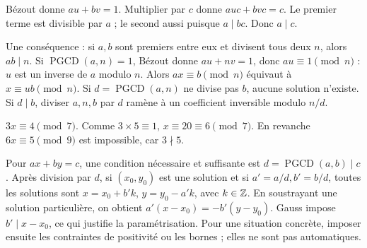\begin{demonstration}
Bézout donne $au+bv=1$. Multiplier par $c$ donne $auc+bvc=c$.
Le premier terme est divisible par $a$ ; le second aussi puisque $a\mid bc$. Donc $a\mid c$.
\end{demonstration}
Une conséquence : si $a,b$ sont premiers entre eux et divisent tous deux $n$, alors $ab\mid n$.
Si $\operatorname{PGCD}(a,n)=1$, Bézout donne $au+nv=1$, donc $au\equiv1\pmod n$ : $u$ est un inverse de $a$ modulo $n$.
Alors $ax\equiv b\pmod n$ équivaut à $x\equiv ub\pmod n$.
Si $d=\operatorname{PGCD}(a,n)$ ne divise pas $b$, aucune solution n'existe.
Si $d\mid b$, diviser $a,n,b$ par $d$ ramène à un coefficient inversible modulo $n/d$.
\begin{exemple}
$3x\equiv4\pmod7$. Comme $3\times5\equiv1$, $x\equiv20\equiv6\pmod7$.
En revanche $6x\equiv5\pmod9$ est impossible, car $3\nmid5$.
\end{exemple}
Pour $ax+by=c$, une condition nécessaire et suffisante est $d=\operatorname{PGCD}(a,b)\mid c$.
Après division par $d$, si $(x_0,y_0)$ est une solution et si $a'=a/d,b'=b/d$, toutes les solutions sont
$x=x_0+b'k$, $y=y_0-a'k$, avec $k\in\mathbb{Z}$.
En soustrayant une solution particulière, on obtient $a'(x-x_0)=-b'(y-y_0)$. Gauss impose $b'\mid x-x_0$, ce qui justifie la paramétrisation.
Pour une situation concrète, imposer ensuite les contraintes de positivité ou les bornes ; elles ne sont pas automatiques.


